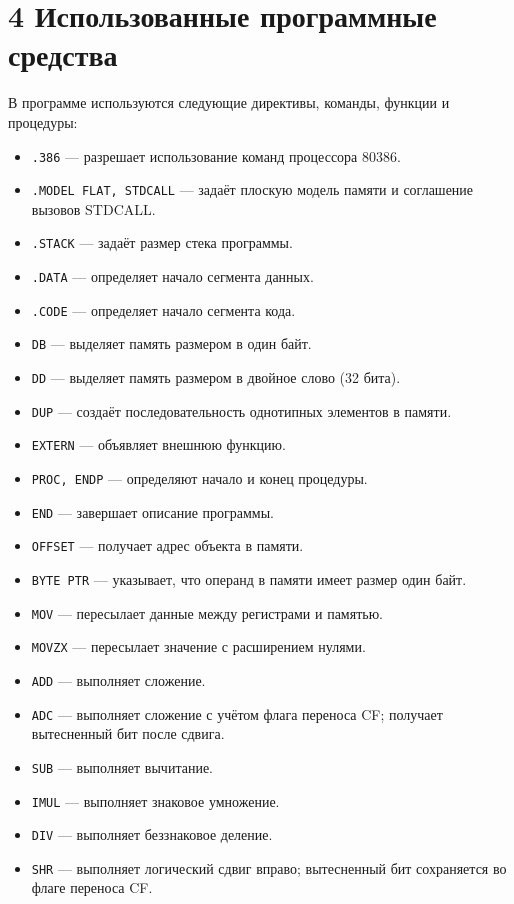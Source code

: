 \documentclass[12pt,a4paper]{article}
\begin{document}
\section*{4 Использованные программные средства}
В программе используются следующие директивы, команды, функции и процедуры:
\begin{itemize}
\item \texttt{.386} --- разрешает использование команд процессора 80386.
\item \texttt{.MODEL FLAT, STDCALL} --- задаёт плоскую модель памяти и соглашение вызовов STDCALL.
\item \texttt{.STACK} --- задаёт размер стека программы.
\item \texttt{.DATA} --- определяет начало сегмента данных.
\item \texttt{.CODE} --- определяет начало сегмента кода.
\item \texttt{DB} --- выделяет память размером в один байт.
\item \texttt{DD} --- выделяет память размером в двойное слово (32 бита).
\item \texttt{DUP} --- создаёт последовательность однотипных элементов в памяти.
\item \texttt{EXTERN} --- объявляет внешнюю функцию.
\item \texttt{PROC, ENDP} --- определяют начало и конец процедуры.
\item \texttt{END} --- завершает описание программы.
\item \texttt{OFFSET} --- получает адрес объекта в памяти.
\item \texttt{BYTE PTR} --- указывает, что операнд в памяти имеет размер один байт.
\item \texttt{MOV} --- пересылает данные между регистрами и памятью.
\item \texttt{MOVZX} --- пересылает значение с расширением нулями.
\item \texttt{ADD} --- выполняет сложение.
\item \texttt{ADC} --- выполняет сложение с учётом флага переноса CF; получает вытесненный бит после сдвига.
\item \texttt{SUB} --- выполняет вычитание.
\item \texttt{IMUL} --- выполняет знаковое умножение.
\item \texttt{DIV} --- выполняет беззнаковое деление.
\item \texttt{SHR} --- выполняет логический сдвиг вправо; вытесненный бит сохраняется во флаге переноса CF.

\end{itemize}
\end{document}
